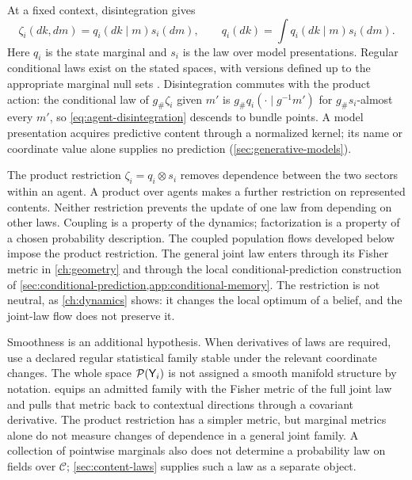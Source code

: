 At a fixed context, disintegration gives
\begin{equation}
\zeta_i(dk,dm)=q_i(dk\mid m)s_i(dm),
\qquad q_i(dk)=\int q_i(dk\mid m)s_i(dm).
\label{eq:agent-disintegration}
\end{equation}
Here $q_i$ is the state marginal and $s_i$ is the law over model presentations. Regular conditional laws exist on the stated spaces, with versions defined up to the appropriate marginal null sets \citep{Kallenberg2021}. Disintegration commutes with the product action: the conditional law of $g_\#\zeta_i$ given $m'$ is $g_\#q_i(\cdot\mid g^{-1}m')$ for $g_\#s_i$-almost every $m'$, so \cref{eq:agent-disintegration} descends to bundle points. A model presentation acquires predictive content through a normalized kernel; its name or coordinate value alone supplies no prediction (\cref{sec:generative-models}).

The product restriction $\zeta_i=q_i\otimes s_i$ removes dependence between the two sectors within an agent. A product over agents makes a further restriction on represented contents. Neither restriction prevents the update of one law from depending on other laws. Coupling is a property of the dynamics; factorization is a property of a chosen probability description. The coupled population flows developed below impose the product restriction. The general joint law enters through its Fisher metric in \cref{ch:geometry} and through the local conditional-prediction construction of \cref{sec:conditional-prediction,app:conditional-memory}. The restriction is not neutral, as \cref{ch:dynamics} shows: it changes the local optimum of a belief, and the joint-law flow does not preserve it.

Smoothness is an additional hypothesis. When derivatives of laws are required, use a declared regular statistical family stable under the relevant coordinate changes. The whole space $\mathcal P(\mathsf Y_i)$ is not assigned a smooth manifold structure by notation.  equips an admitted family with the Fisher metric of the full joint law and pulls that metric back to contextual directions through a covariant derivative. The product restriction has a simpler metric, but marginal metrics alone do not measure changes of dependence in a general joint family. A collection of pointwise marginals also does not determine a probability law on fields over $\mathcal C$; \cref{sec:content-laws} supplies such a law as a separate object.

